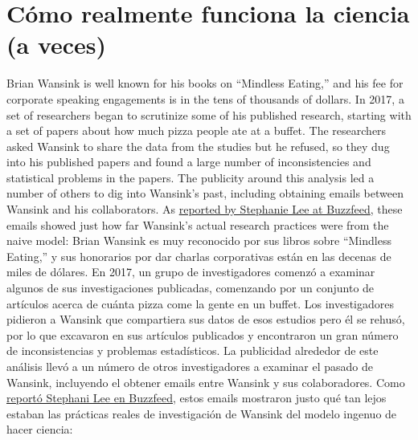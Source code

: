 \documentclass[
  12pt,
]{book}
\theoremstyle{definition}
\theoremstyle{definition}
\theoremstyle{definition}
\theoremstyle{remark}
\begin{document}
\hypertarget{cuxf3mo-realmente-funciona-la-ciencia-a-veces}{%
\section{Cómo realmente funciona la ciencia (a veces)}\label{cuxf3mo-realmente-funciona-la-ciencia-a-veces}}

Brian Wansink is well known for his books on ``Mindless Eating,'' and his fee for corporate speaking engagements is in the tens of thousands of dollars. In 2017, a set of researchers began to scrutinize some of his published research, starting with a set of papers about how much pizza people ate at a buffet. The researchers asked Wansink to share the data from the studies but he refused, so they dug into his published papers and found a large number of inconsistencies and statistical problems in the papers. The publicity around this analysis led a number of others to dig into Wansink's past, including obtaining emails between Wansink and his collaborators. As \href{https://www.buzzfeednews.com/article/stephaniemlee/brian-wansink-cornell-p-hacking}{reported by Stephanie Lee at Buzzfeed}, these emails showed just how far Wansink's actual research practices were from the naive model:
Brian Wansink es muy reconocido por sus libros sobre ``Mindless Eating,'' y sus honorarios por dar charlas corporativas están en las decenas de miles de dólares. En 2017, un grupo de investigadores comenzó a examinar algunos de sus investigaciones publicadas, comenzando por un conjunto de artículos acerca de cuánta pizza come la gente en un buffet. Los investigadores pidieron a Wansink que compartiera sus datos de esos estudios pero él se rehusó, por lo que excavaron en sus artículos publicados y encontraron un gran número de inconsistencias y problemas estadísticos. La publicidad alrededor de este análisis llevó a un número de otros investigadores a examinar el pasado de Wansink, incluyendo el obtener emails entre Wansink y sus colaboradores. Como \href{https://www.buzzfeednews.com/article/stephaniemlee/brian-wansink-cornell-p-hacking}{reportó Stephani Lee en Buzzfeed}, estos emails mostraron justo qué tan lejos estaban las prácticas reales de investigación de Wansink del modelo ingenuo de hacer ciencia:
\end{document}
